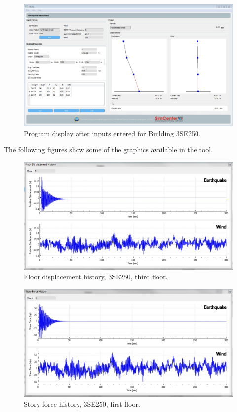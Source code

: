 \documentclass{simcenterdocumentation}
\begin{document}
\begin{figure}[H]
	\centering \includegraphics[width=0.9\linewidth]{3SE250_1.jpg}
	\caption{Program display after inputs entered for Building 3SE250.}
\end{figure}
The following figures show some of the graphics available in the tool.
\begin{figure}[H]
	\centering \includegraphics[scale=0.35]{3SE250_fdh.JPG}
	\caption{Floor displacement history, 3SE250, third floor.}
\end{figure}
\begin{figure}[H]
	\centering \includegraphics[scale=0.35]{3SE250_sfh.JPG}
	\caption{Story force history, 3SE250, first floor.}
\end{figure}
\end{document}
